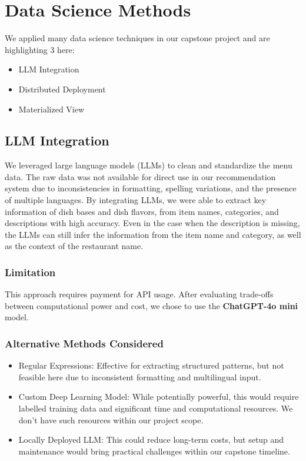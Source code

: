 \documentclass[
  11pt,
  a4paper,
  DIV=11,
  numbers=noendperiod]{scrartcl}
\providecommand{\tightlist}{%
  \setlength{\itemsep}{0pt}\setlength{\parskip}{0pt}}\usepackage{longtable,booktabs,array}
\begin{document}
\section{Data Science Methods}\label{data-science-methods}

We applied many data science techniques in our capstone project and are
highlighting 3 here:

\begin{itemize}
\tightlist
\item
  LLM Integration
\item
  Distributed Deployment
\item
  Materialized View
\end{itemize}

\subsection{LLM Integration}\label{llm-integration}

We leveraged large language models (LLMs) to clean and standardize the
menu data. The raw data was not available for direct use in our
recommendation system due to inconsistencies in formatting, spelling
variations, and the presence of multiple languages. By integrating LLMs,
we were able to extract key information of dish bases and dish flavors,
from item names, categories, and descriptions with high accuracy. Even
in the case when the description is missing, the LLMs can still infer
the information from the item name and category, as well as the context
of the restaurant name.

\subsubsection{Limitation}\label{limitation}

This approach requires payment for API usage. After evaluating
trade-offs between computational power and cost, we chose to use the
\textbf{ChatGPT-4o mini} model.

\subsubsection{Alternative Methods
Considered}\label{alternative-methods-considered}

\begin{itemize}
\tightlist
\item
  Regular Expressions: Effective for extracting structured patterns, but
  not feasible here due to inconsistent formatting and multilingual
  input.
\item
  Custom Deep Learning Model: While potentially powerful, this would
  require labelled training data and significant time and computational
  resources. We don't have such resources within our project scope.
\item
  Locally Deployed LLM: This could reduce long-term costs, but setup and
  maintenance would bring practical challenges within our capstone
  timeline.
\end{itemize}
\end{document}
